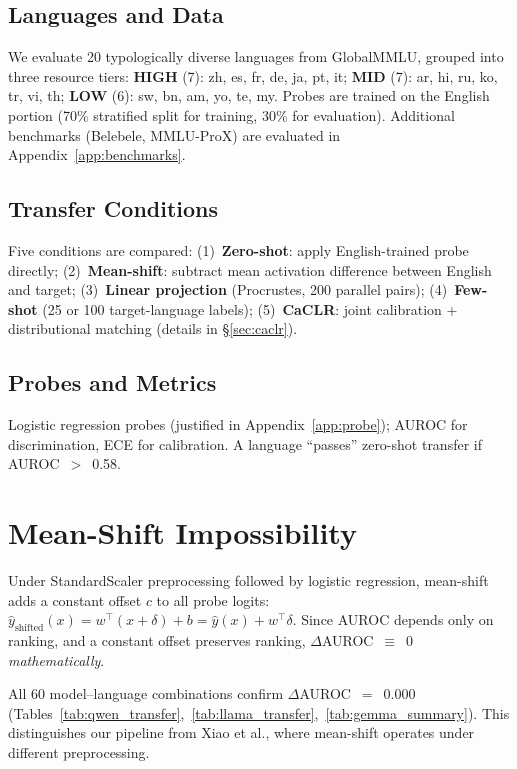 \documentclass[11pt,a4paper]{article}
\begin{document}
\subsection{Languages and Data}
We evaluate 20 typologically diverse languages from GlobalMMLU, grouped into three resource tiers:
\textbf{HIGH} (7): zh, es, fr, de, ja, pt, it;
\textbf{MID} (7): ar, hi, ru, ko, tr, vi, th;
\textbf{LOW} (6): sw, bn, am, yo, te, my.
Probes are trained on the English portion (70\% stratified split for training, 30\% for evaluation).
Additional benchmarks (Belebele, MMLU-ProX) are evaluated in Appendix~\ref{app:benchmarks}.

\subsection{Transfer Conditions}
\label{sec:conditions}
Five conditions are compared:
(1)~\textbf{Zero-shot}: apply English-trained probe directly;
(2)~\textbf{Mean-shift}: subtract mean activation difference between English and target;
(3)~\textbf{Linear projection} (Procrustes, 200 parallel pairs);
(4)~\textbf{Few-shot} (25 or 100 target-language labels);
(5)~\textbf{CaCLR}: joint calibration + distributional matching (details in \S\ref{sec:caclr}).

\subsection{Probes and Metrics}
Logistic regression probes (justified in Appendix~\ref{app:probe}); AUROC for discrimination, ECE for calibration.
A language ``passes'' zero-shot transfer if AUROC~$>$~0.58.

\section{Mean-Shift Impossibility}
\label{sec:meanshift}

Under StandardScaler preprocessing followed by logistic regression, mean-shift adds a constant offset $c$ to all probe logits:
$\hat{y}_{\text{shifted}}(x) = w^\top(x + \delta) + b = \hat{y}(x) + w^\top\delta$.
Since AUROC depends only on ranking, and a constant offset preserves ranking, $\Delta$AUROC~$\equiv$~0 \emph{mathematically}.

All 60 model--language combinations confirm $\Delta$AUROC~$=$~0.000 (Tables~\ref{tab:qwen_transfer},~\ref{tab:llama_transfer},~\ref{tab:gemma_summary}).
This distinguishes our pipeline from Xiao et al., where mean-shift operates under different preprocessing.
\end{document}
